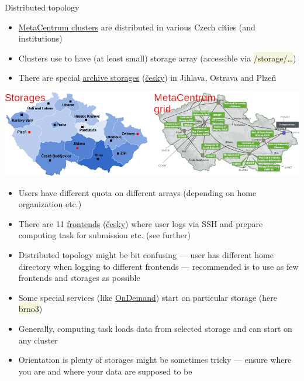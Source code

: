 \documentclass[compress, ucs, xelatex, 11pt, xcolor=svgnames, aspectratio=169,
	hyperref={
		bookmarks=true,
		unicode=true,
		colorlinks=true,
		pdftitle={Linux, command line and MetaCentrum},
		plainpages=false,
		pdfauthor={Vojtech Zeisek},
		pdfsubject={Course about use of Linux command line, writing shell scripts and using MetaCentrum of CESNET},
		pdfcreator={XeLaTeX},
		pdfkeywords={Linux, GNU, BASH, shell, command line, MetaCentrum},
		linkcolor=DarkRed, %
		anchorcolor=DarkBlue, %
		citecolor=Indigo, %
		filecolor=NavyBlue, %
		menucolor=DarkMagenta, %
		urlcolor=DarkBlue, %
		pdftex},
	url={hyphens, lowtilde} %
	]{beamer}
\renewcommand{\texttt}[1]{\colorbox{Beige}{{\ttfamily #1}}}
\begin{document}
\begin{frame}[allowframebreaks]{Distributed topology}
	\begin{itemize}
		\item \href{https://metavo.metacentrum.cz/}{MetaCentrum clusters} are distributed in various Czech cities (and institutions)
		\item Clusters use to have (at least small) storage array (accessible via \texttt{/storage/\ldots})
		\item There are special \href{https://du.cesnet.cz/en/infrastruktura_ulozist/start}{archive storages} (\href{https://du.cesnet.cz/cs/infrastruktura_ulozist/start}{česky}) in Jihlava, Ostrava and Plzeň
	\end{itemize}
	\begin{center}
		\includegraphics[width=\textwidth]{metacentrum_map.png}
	\end{center}
	\begin{itemize}
		\item Users have different quota on different arrays (depending on home organization etc.)
		\item There are 11 \href{https://wiki.metacentrum.cz/wiki/Frontend}{frontends} (\href{https://wiki.metacentrum.cz/wiki/Celni_uzel}{česky}) where user logs via SSH and prepare computing task for submission etc. (see further)
		\item Distributed topology might be bit confusing --- user has different home directory when logging to different frontends --- recommended is to use as few frontends and storages as possible
		\item Some special services (like \href{https://wiki.metacentrum.cz/wiki/OnDemand}{OnDemand}) start on particular storage (here \texttt{brno3})
		\item Generally, computing task loads data from selected storage and can start on any cluster
		\item Orientation is plenty of storages might be sometimes tricky --- ensure where you are and where your data are supposed to be
	\end{itemize}
\end{frame}
\end{document}
